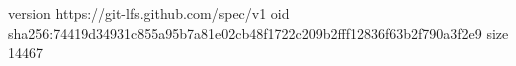 version https://git-lfs.github.com/spec/v1
oid sha256:74419d34931c855a95b7a81e02cb48f1722c209b2fff12836f63b2f790a3f2e9
size 14467
